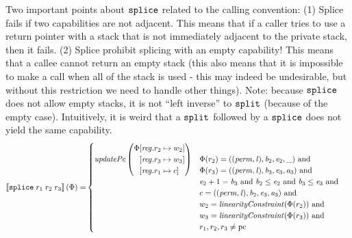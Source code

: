 \documentclass[a4paper]{article}
\begin{document}
Two important points about $\tsplice{}{}{}$ related to the calling convention: (1) Splice fails if two capabilities are not adjacent. This means that if a caller tries to use a return pointer with a stack that is not immediately adjacent to the private stack, then it fails. (2) Splice prohibit splicing with an empty capability! This means that a callee cannot return an empty stack (this also means that it is impossible to make a call when all of the stack is used - this may indeed be undesirable, but without this restriction we need to handle other things).
Note: because $\tsplice{}{}{}$ does not allow empty stacks, it is not ``left inverse'' to $\tsplit{}{}{}{}$ (because of the empty case). Intuitively, it is weird that a $\tsplit{}{}{}{}$ followed by a $\tsplice{}{}{}$ does not yield the same capability.
\begin{align*}
  \sem{\tsplice{r_1}{r_2}{r_3}}(\Phi) = &
                              \begin{cases}
                                \updPcAddr{}\left(
                                \arraycolsep=0pt
                                \begin{array}{r l}
                                  \Phi&\updReg{r_2}{w_2}\\
                                      &\updReg{r_3}{w_3}\\
                                      &\updReg{r_1}{c}
                                \end{array}\right)
&
                                \arraycolsep=0pt
                                \begin{array}[t]{l}
                                  \Phi(r_2) = ((\perm,\lin),\baddr_2,\eaddr_2,\_) \tand \\
                                  \Phi(r_3) = ((\perm,\lin),\baddr_3,\eaddr_3,\aaddr_3) \tand \\
                                  \eaddr_2 + 1 = \baddr_3 \tand \baddr_2 \leq \eaddr_2 \tand \baddr_3 \leq \eaddr_3 \tand \\
                                  c = ((\perm,\lin),\baddr_2,\eaddr_3,\aaddr_3) \tand\\
                                  w_2 = \linCons{\Phi(r_2)} \tand \\
                                  w_3 = \linCons{\Phi(r_3)}  \tand \\
                                  r_1,r_2,r_3 \neq \pcreg\\
                                \end{array}\\

\end{cases}
\end{align*}
\end{document}
